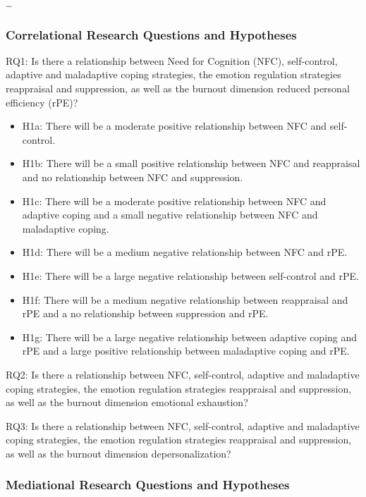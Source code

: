 \documentclass[
  man]{apa6}
\begin{document}
\ldots{}

\subsubsection{Correlational Research Questions and Hypotheses}\label{correlational-research-questions-and-hypotheses}

RQ1: Is there a relationship between Need for Cognition (NFC), self-control, adaptive and maladaptive coping strategies, the emotion regulation strategies reappraisal and suppression, as well as the burnout dimension reduced personal efficiency (rPE)?

\begin{itemize}
\item
  H1a: There will be a moderate positive relationship between NFC and self-control.
\item
  H1b: There will be a small positive relationship between NFC and reappraisal and no relationship between NFC and suppression.
\item
  H1c: There will be a moderate positive relationship between NFC and adaptive coping and a small negative relationship between NFC and maladaptive coping.
\item
  H1d: There will be a medium negative relationship between NFC and rPE.
\item
  H1e: There will be a large negative relationship between self-control and rPE.
\item
  H1f: There will be a medium negative relationship between reappraisal and rPE and a no relationship between suppression and rPE.
\item
  H1g: There will be a large negative relationship between adaptive coping and rPE and a large positive relationship between maladaptive coping and rPE.
\end{itemize}

RQ2: Is there a relationship between NFC, self-control, adaptive and maladaptive coping strategies, the emotion regulation strategies reappraisal and suppression, as well as the burnout dimension emotional exhaustion?

RQ3: Is there a relationship between NFC, self-control, adaptive and maladaptive coping strategies, the emotion regulation strategies reappraisal and suppression, as well as the burnout dimension depersonalization?

\subsubsection{Mediational Research Questions and Hypotheses}\label{mediational-research-questions-and-hypotheses}
\end{document}
